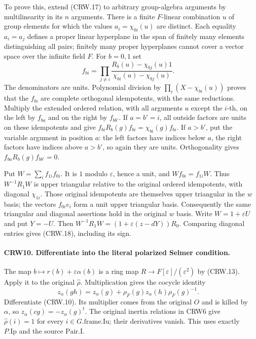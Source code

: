 To prove this, extend (CRW.17) to arbitrary group-algebra
arguments by multilinearity in its $n$ arguments.
There is a finite $F$-linear combination $u$ of group elements
for which the values $a_i=\chi_{0i}(u)$ are distinct.
Each equality $a_i=a_j$ defines a proper linear hyperplane
in the span of finitely many elements distinguishing all
pairs; finitely many proper hyperplanes cannot cover a vector
space over the infinite field $F$.
For $b=0,1$ set
\[
 f_{bi}=\prod_{j\ne i}
       \frac{R_b(u)-\chi_{bj}(u)1}
            {\chi_{bi}(u)-\chi_{bj}(u)}.
\]
The denominators are units.  Polynomial division by
$\prod_i(X-\chi_{bi}(u))$ proves that the $f_{bi}$ are
complete orthogonal idempotents, with the same reductions.
Multiply the extended ordered relation, with all arguments
$u$ except the $i$-th, on the left by $f_{ba}$ and on the
right by $f_{bb'}$.  If $a=b'=i$, all outside factors are
units on these idempotents and give
$f_{bi}R_b(g)f_{bi}=\chi_{bi}(g)f_{bi}$.
If $a>b'$, put the variable argument in position $a$:
the left factors have indices below $a$, the right factors
have indices above $a>b'$, so again they are units.  Orthogonality
gives $f_{ba}R_b(g)f_{bb'}=0$.

Put $W=\sum_i f_{1i}f_{0i}$.  It is $1$ modulo
$\varepsilon$, hence a unit, and $Wf_{0i}=f_{1i}W$.
Thus $W^{-1}R_1W$ is upper triangular relative to the
original ordered idempotents, with diagonal $\chi_{1i}$.
Those original idempotents are themselves upper triangular
in the $w$ basis; the vectors $f_{0i}e_i$ form a unit upper
triangular basis.  Consequently the same triangular and
diagonal assertions hold in the original $w$ basis.
Write $W=1+\varepsilon U$ and put $Y=-U$.
Then
$W^{-1}R_1W=(1+\varepsilon(z-dY))R_0$.
Comparing diagonal entries gives (CRW.18), including its sign.

\paragraph{CRW10. Differentiate into the literal polarized Selmer condition.}
\label{claim:CRW10}
The map
$b\mapsto r(b)+\varepsilon\alpha(b)$ is a ring map
$R\to F[\varepsilon]/(\varepsilon^2)$ by (CRW.13).
Apply it to the original $\widehat\rho$.
Multiplication gives the cocycle identity
\[
 z_\alpha(gh)=z_\alpha(g)+
       \rho_F(g)z_\alpha(h)\rho_F(g)^{-1}.
\]
Differentiate (CRW.10).  Its multiplier comes from the
original $O$ and is killed by $\alpha$, so
$z_\alpha(cg)=-z_\alpha(g)^t$.
The original inertia relations in CRW6 give
$\widehat\rho(i)=1$ for every $i\in G.\mathrm{frame.Iu}$;
their derivatives vanish.  This uses exactly
$P.\mathrm{Ip}$ and the source $\mathrm{Pair.I}$.

